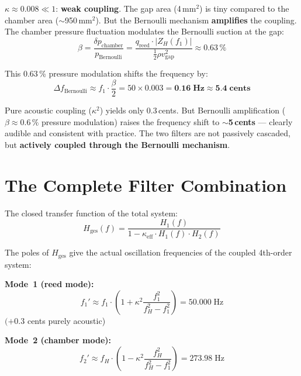 \documentclass[11pt,a4paper]{article}
\begin{document}
$\kappa \approx 0{.}008 \ll 1$: \textbf{weak coupling}. The gap area (4\,mm$^2$) is tiny compared to the chamber area ($\sim$950\,mm$^2$). But the Bernoulli mechanism \textbf{amplifies} the coupling. The chamber pressure fluctuation modulates the Bernoulli suction at the gap:
\begin{equation}
\beta = \frac{\delta p_\text{chamber}}{p_\text{Bernoulli}} = \frac{q_\text{reed} \cdot |Z_H(f_1)|}{\frac{1}{2}\rho v_\text{gap}^2} \approx 0{.}63\,\%
\end{equation}

This 0.63\,\% pressure modulation shifts the frequency by:
\begin{equation}
\Delta f_\text{Bernoulli} \approx f_1 \cdot \frac{\beta}{2} = 50 \times 0{.}003 = \mathbf{0{.}16\;\text{Hz} \approx 5{.}4\;\text{cents}}
\end{equation}

\begin{keybox}
Pure acoustic coupling ($\kappa^2$) yields only 0.3\,cents. But Bernoulli amplification ($\beta \approx 0{.}6\,\%$ pressure modulation) raises the frequency shift to \textbf{$\sim$5\,cents} --- clearly audible and consistent with practice. The two filters are not passively cascaded, but \textbf{actively coupled through the Bernoulli mechanism}.
\end{keybox}

\section{The Complete Filter Combination}

The closed transfer function of the total system:
\begin{equation}
\boxed{H_\text{ges}(f) = \frac{H_1(f)}{1 - \kappa_\text{eff} \cdot H_1(f) \cdot H_2(f)}}
\end{equation}

The poles of $H_\text{ges}$ give the actual oscillation frequencies of the coupled 4th-order system:

\textbf{Mode~1 (reed mode):}
\begin{equation}
f_1' \approx f_1 \cdot \left(1 + \kappa^2 \frac{f_1^2}{f_H^2 - f_1^2}\right) = 50{.}000\;\text{Hz}
\end{equation}
$(+0.3$ cents purely acoustic)

\textbf{Mode~2 (chamber mode):}
\begin{equation}
f_2' \approx f_H \cdot \left(1 - \kappa^2 \frac{f_H^2}{f_H^2 - f_1^2}\right) = 273{.}98\;\text{Hz}
\end{equation}
\end{document}
